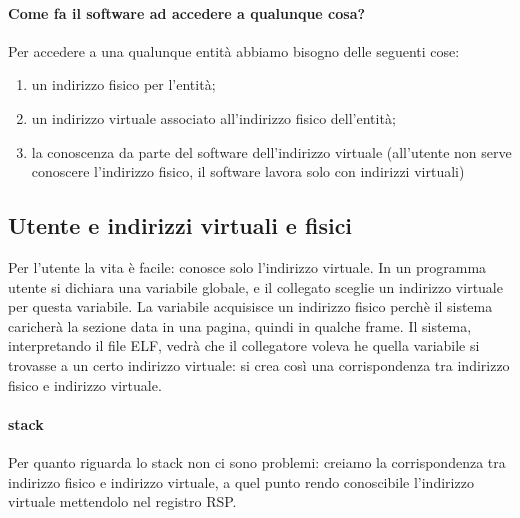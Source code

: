 \documentclass[11pt]{report}
\theoremstyle{definition}
\begin{document}
\paragraph{Come fa il software ad accedere a qualunque cosa?} Per accedere a una qualunque entità abbiamo bisogno delle seguenti cose:
\begin{enumerate}
	\item un indirizzo fisico per l'entità;
	\item un indirizzo virtuale associato all'indirizzo fisico dell'entità;
	\item la conoscenza da parte del software dell'indirizzo virtuale (all'utente non serve conoscere l'indirizzo fisico, il software lavora solo con indirizzi virtuali)
\end{enumerate} 

\subsection{Utente e indirizzi virtuali e fisici}
 Per l'utente la vita è facile: conosce solo l'indirizzo virtuale. In un programma utente si dichiara una variabile globale, e il collegato sceglie un indirizzo virtuale per questa variabile. La variabile acquisisce un indirizzo fisico perchè il sistema caricherà la sezione data in una pagina, quindi in qualche frame. Il sistema, interpretando il file ELF, vedrà che il collegatore voleva he quella variabile si trovasse a un certo indirizzo virtuale: si crea così una corrispondenza tra indirizzo fisico e indirizzo virtuale.
 
 
 \paragraph{stack} Per quanto riguarda lo stack non ci sono problemi: creiamo la corrispondenza tra indirizzo fisico e indirizzo virtuale, a quel punto rendo conoscibile  l'indirizzo virtuale mettendolo  nel registro RSP.
 
 
 
\end{document}
